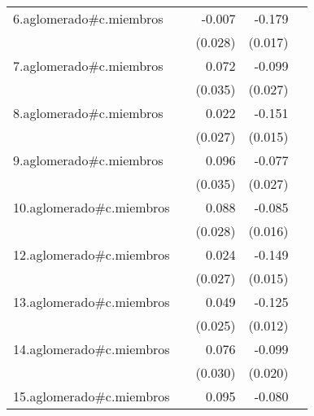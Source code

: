 {\begin{longtable}{l*{4}{D{.}{.}{-1}}}
\addlinespace
6.aglomerado#c.miembros&                     &      -0.007         &      -0.179\sym{***}&                     \\
            &                     &     (0.028)         &     (0.017)         &                     \\
\addlinespace
7.aglomerado#c.miembros&                     &       0.072\sym{*}  &      -0.099\sym{***}&                     \\
            &                     &     (0.035)         &     (0.027)         &                     \\
\addlinespace
8.aglomerado#c.miembros&                     &       0.022         &      -0.151\sym{***}&                     \\
            &                     &     (0.027)         &     (0.015)         &                     \\
\addlinespace
9.aglomerado#c.miembros&                     &       0.096\sym{**} &      -0.077\sym{**} &                     \\
            &                     &     (0.035)         &     (0.027)         &                     \\
\addlinespace
10.aglomerado#c.miembros&                     &       0.088\sym{**} &      -0.085\sym{***}&                     \\
            &                     &     (0.028)         &     (0.016)         &                     \\
\addlinespace
12.aglomerado#c.miembros&                     &       0.024         &      -0.149\sym{***}&                     \\
            &                     &     (0.027)         &     (0.015)         &                     \\
\addlinespace
13.aglomerado#c.miembros&                     &       0.049         &      -0.125\sym{***}&                     \\
            &                     &     (0.025)         &     (0.012)         &                     \\
\addlinespace
14.aglomerado#c.miembros&                     &       0.076\sym{*}  &      -0.099\sym{***}&                     \\
            &                     &     (0.030)         &     (0.020)         &                     \\
\addlinespace
15.aglomerado#c.miembros&                     &       0.095\sym{**} &      -0.080\sym{***}&                     \\

\end{longtable}}

